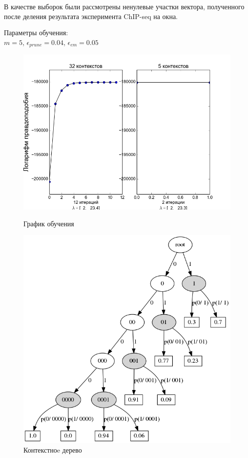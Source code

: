 \documentclass{matmex-diploma-custom}
\begin{document}
В качестве выборок были рассмотрены ненулевые участки вектора, полученного после деления результата эксперимента ChIP-seq на окна. 

Параметры обучения:\\
$m = 5$, $\epsilon_{\textit{prune}} = 0.04$, $\epsilon_{\textit{em}} = 0.05$
\begin{figure}[h!]\centering
\begin{minipage}[b]{0.49 \textwidth}
	\includegraphics[scale=0.47]{img/real/plot_.png}
	\centering
	\caption{ График обучения }
	\label{ris:log_likelihood}
\end{minipage}
\hfill
\begin{minipage}[b]{0.32 \textwidth}
	\includegraphics[scale=0.29]{img/real/predicted_trie.png}
	\centering
	\caption{ Контекстноe дерево }
	\label{ris:real_trie}
\end{minipage}
\end{figure}
\end{document}
